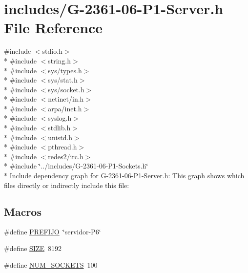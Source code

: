 \hypertarget{_g-2361-06-_p1-_server_8h}{}\section{includes/\+G-\/2361-\/06-\/\+P1-\/\+Server.h File Reference}
\label{_g-2361-06-_p1-_server_8h}
{\ttfamily \#include $<$stdio.\+h$>$}\\*
{\ttfamily \#include $<$string.\+h$>$}\\*
{\ttfamily \#include $<$sys/types.\+h$>$}\\*
{\ttfamily \#include $<$sys/stat.\+h$>$}\\*
{\ttfamily \#include $<$sys/socket.\+h$>$}\\*
{\ttfamily \#include $<$netinet/in.\+h$>$}\\*
{\ttfamily \#include $<$arpa/inet.\+h$>$}\\*
{\ttfamily \#include $<$syslog.\+h$>$}\\*
{\ttfamily \#include $<$stdlib.\+h$>$}\\*
{\ttfamily \#include $<$unistd.\+h$>$}\\*
{\ttfamily \#include $<$pthread.\+h$>$}\\*
{\ttfamily \#include $<$redes2/irc.\+h$>$}\\*
{\ttfamily \#include \char`\"{}../includes/\+G-\/2361-\/06-\/\+P1-\/\+Sockets.\+h\char`\"{}}\\*
Include dependency graph for G-\/2361-\/06-\/\+P1-\/\+Server.h\+:
This graph shows which files directly or indirectly include this file\+:
\subsection*{Macros}
\begin{DoxyCompactItemize}
\item 
\#define \hyperlink{_g-2361-06-_p1-_server_8h_a78c658ff923693099f7b621e7c351129}{P\+R\+E\+F\+I\+J\+O}~\char`\"{}servidor-\/P6\char`\"{}
\item 
\#define \hyperlink{_g-2361-06-_p1-_server_8h_a70ed59adcb4159ac551058053e649640}{S\+I\+Z\+E}~8192
\item 
\#define \hyperlink{_g-2361-06-_p1-_server_8h_a1c803e4ececfb47d2791c9283c85eb00}{N\+U\+M\+\_\+\+S\+O\+C\+K\+E\+T\+S}~100
\end{DoxyCompactItemize}
